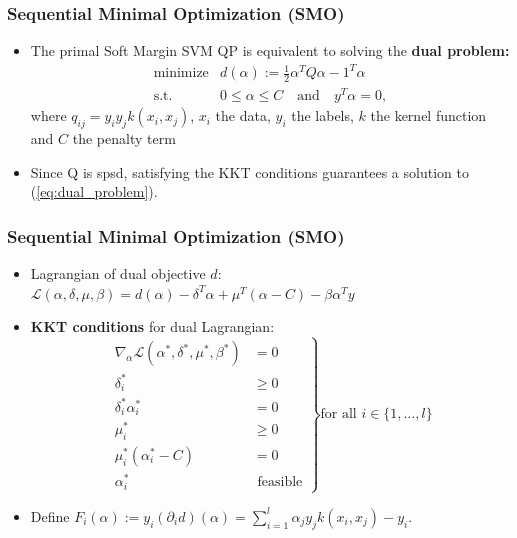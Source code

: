 \documentclass[12pt, compress]{beamer}
\newcommand{\titleC}{Sequential Minimal Optimization (SMO)}
\begin{document}
\begin{frame}
  \frametitle{\titleC}
  \begin{itemize}
  	\item The primal Soft Margin SVM QP is equivalent to solving the \textbf{\alert{dual problem:}}
  	\begin{eqnarray*}\label{eq:dual_problem}
  	\text{minimize} & d(\alpha) := \frac{1}{2} \alpha^T Q \alpha - 1^T \alpha  \\ 
  	\nonumber
  	\text{s.t.} &  0 \leq \alpha \leq C  \quad \text{and} \quad 	y^T \alpha = 0,
  	\end{eqnarray*}
  	where $q_{ij} = y_i y_j k(x_i,x_j)$, $x_i$ the data, $y_i$ the labels, $k$ the kernel function and $C$ the penalty term
  	\item Since Q is spsd, satisfying the KKT conditions guarantees a solution to (\ref{eq:dual_problem}).
  \end{itemize}
\end{frame}

\begin{frame}
\frametitle{\titleC}
\begin{itemize}
	
	\item Lagrangian of dual objective $d$: $\mathcal{L}(\alpha,\delta,\mu,\beta) = d(\alpha) - \delta^T\alpha + \mu^T(\alpha - C) - \beta \alpha^T y$
	\item \textbf{\alert{KKT conditions}} for dual Lagrangian:
	\begin{equation*}
	\left.
	\begin{aligned}
	\nabla_{\alpha} \mathcal{L}(\alpha^*,\delta^*,\mu^*,\beta^*) &= 0\\
	\delta_i^* &\geq 0\\
	\delta_i^* \alpha_i^* &= 0\\
	\mu_i^* &\geq 0\\
	\mu_i^* (\alpha_i^*-C) &= 0\\
	\alpha_i^* &\text{ feasible}
	\end{aligned}
	\right\} \text{for all } i \in \{1,\ldots,l\}
	\end{equation*}
	\item Define $F_i(\alpha) := y_i (\partial_i d)(\alpha) = \sum_{i = 1}^l \alpha_j y_j k(x_i,x_j) - y_i$.
\end{itemize}
\end{frame}
\end{document}
